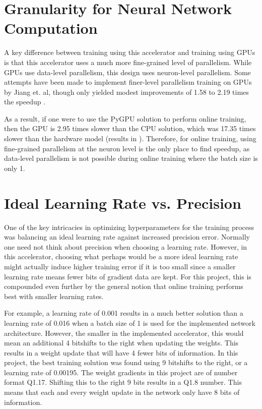 \section{Granularity for Neural Network Computation}
A key difference between training using this accelerator and training using GPUs is that this accelerator uses a much more fine-grained level of parallelism. While GPUs use data-level parallelism, this design uses neuron-level parallelism. Some attempts  have been made to implement finer-level parallelism training on GPUs by Jiang et. al, though only yielded modest improvements of 1.58 to 2.19 times the speedup \cite{fine-grained-gpu}. 

As a result, if one were to use the PyGPU solution to perform online training, then the GPU is 2.95 times slower than the CPU solution, which was 17.35 times slower than the hardware model (results in \cite[inline]{Experiment results appendix}). Therefore, for online training, using fine-grained parallelism at the neuron level is the only place to find speedup, as data-level parallelism is not possible during online training where the batch size is only 1.

\section{Ideal Learning Rate vs. Precision}
One of the key intricacies in optimizing hyperparameters for the training process was balancing an ideal learning rate against increased precision error. Normally one need not think about precision when choosing a learning rate. However, in this accelerator, choosing what perhaps would be a more ideal learning rate might actually induce higher training error if it is too small since a smaller learning rate means fewer bits of gradient data are kept. For this project, this is compounded even further by the general notion that online training performs best with smaller learning rates. 

For example, a learning rate of 0.001 results in a much better solution than a learning rate of 0.016 when a batch size of 1 is used for the implemented network architecture. However, the smaller in the implemented accelerator, this would mean an additional 4 bitshifts to the right when updating the weights. This results in a weight update that will have 4 fewer bits of information. In this project, the best training solution was found using 9 bitshifts to the right, or a learning rate of 0.00195. The weight gradients in this project are of number format Q1.17. Shifting this to the right 9 bits results in a Q1.8 number. This means that each and every weight update in the network only have 8 bits of information.

